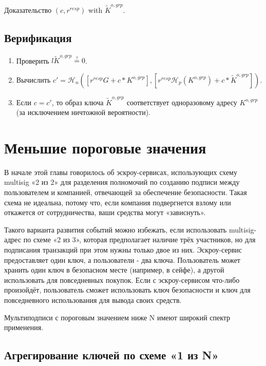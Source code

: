 Доказательство $(c,r^{resp})$ with $\tilde{K}^{o,grp}$.


\subsection*{Верификация}

\begin{enumerate}
    \item Проверить $l \tilde{K}^{o,grp} \stackrel{?}{=} 0$.
    \item Вычислить $c' = \mathcal{H}_n([r^{resp} G + c*K^{o,grp}],[r^{resp} \mathcal{H}_p(K^{o,grp}) + c*\tilde{K}^{o,grp}])$.
    \item Если $c = c'$, то образ ключа $\tilde{K}^{o,grp}$ соответствует одноразовому адресу $K^{o,grp}$ (за исклю\-чением ничтожной вероятности).
\end{enumerate}


    
\section{Меньшие пороговые значения}
\label{sec:smaller-thresholds}

В начале этой главы говорилось об эскроу-сервисах, использующих схему multisig «2 из 2» для разделения полномочий по созданию подписи между пользователем и компанией, отвечающей за обеспечение безопасности. Такая схема не идеальна, потому что, если компания подверг\-нется взлому или откажется от сотрудничества, ваши средства могут «зависнуть».

Такого варианта развития событий можно избежать, если использовать multisig-адрес по схеме «2 из 3», которая предполагает наличие трёх участников, но для подписания транзакций при этом нужны только двое из них. Эскроу-сервис предоставляет один ключ, а пользователи - два ключа. Пользователь может хранить один ключ в безопасном месте (например, в сейфе), а другой использовать для повседневных покупок. Если с эскроу-сервисом что-либо произойдёт, пользователь сможет использовать ключ безопасности и ключ для повседневного использования для вывода своих средств.

Мультиподписи с пороговым значением ниже N имеют широкий спектр применения.


\subsection{Агрегирование ключей по схеме «1 из N»}
\label{sec:1-of-n}

